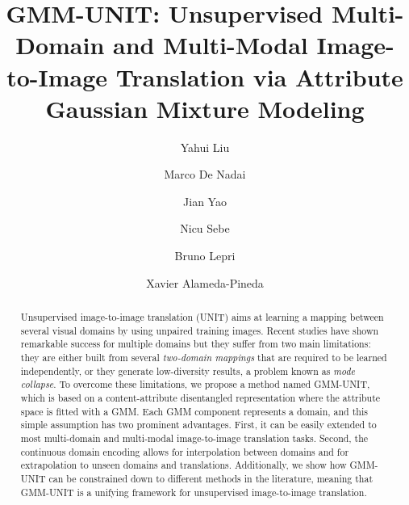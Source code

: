 \documentclass[runningheads]{llncs}
\begin{document}
\pagestyle{headings}
\mainmatter

\title{GMM-UNIT: Unsupervised Multi-Domain and Multi-Modal Image-to-Image Translation via Attribute Gaussian Mixture Modeling} 



\author{Yahui Liu \and
Marco De Nadai \and
Jian Yao \and
Nicu Sebe \and
Bruno Lepri \and
Xavier Alameda-Pineda}

\maketitle

\begin{abstract}
Unsupervised image-to-image translation (UNIT) aims at learning a mapping between several visual domains by using unpaired training images. Recent studies have shown remarkable success for multiple domains but they suffer from two main limitations: they are either built from several \textit{two-domain mappings} that are required to be learned independently, or they generate low-diversity results, a problem known as \textit{mode collapse}. To overcome these limitations, we propose a method named GMM-UNIT, which is based on a content-attribute disentangled representation where the attribute space is fitted with a GMM. Each GMM component represents a domain, and this simple assumption has two prominent advantages. 
First, it can be easily extended to most multi-domain and multi-modal image-to-image translation tasks. 
Second, the continuous domain encoding allows for interpolation between domains and for extrapolation to unseen domains and translations. 
Additionally, we show how GMM-UNIT can be constrained down to different methods in the literature, meaning that GMM-UNIT is a unifying framework for unsupervised image-to-image translation.

\end{abstract}
\end{document}
